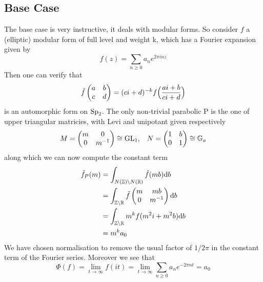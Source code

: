 \subsection{Base Case}
The base case is very instructive, it deals with modular forms. So consider \(f\) a (elliptic) modular form of full level and weight k, which has a Fourier expansion given by 
\[f(z) = \sum_{n\geq 0} a_ne^{2\pi i nz }\]
Then one can verify that
\[\tilde f \begin{pmatrix}
    a & b\\
    c & d
\end{pmatrix} = (ci+d)^{-k} f\Bigl(\frac{ai+b}{ci+d}\Bigr)\]
is an automorphic form on \(\operatorname{Sp}_2\). The only non-trivial parabolic P is the one of upper triangular matricies, with Levi and unipotant given respectively 
\[M = \begin{pmatrix} m & 0\\ 0 & m^{-1}\end{pmatrix}\cong \operatorname{GL}_1 , \;\;\; N = \begin{pmatrix} 1 & b\\ 0 & 1\end{pmatrix} \cong \mathbb{G}_a\]
along which we can now compute the constant term 
\begin{equation*}
    \begin{aligned}
		\tilde f_P(m)
		& = \int_{N(\Z)\backslash N(\R)}\tilde f (mb) \mathrm{d}b\\
		& =  \int_{\Z\backslash\R}\tilde f \begin{pmatrix} m & mb\\ 0 & m^{-1}\end{pmatrix}\mathrm{d}b\\
		& = \int_{\Z\backslash\R} m^k f(m^2i+m^2b) \mathrm{d}b\\
            & = m^k a_0 \\
	\end{aligned}
\end{equation*}
We have chosen normalisation to remove the usual factor of \(1/2\pi\) in the constant term of the Fourier series. Moreover we see that
\[\Phi(f)= \lim_{t\to \infty} f(it) =\lim_{t\to \infty} \sum_{n\geq 0} a_ne^{-2\pi nt }  =  a_0\]

